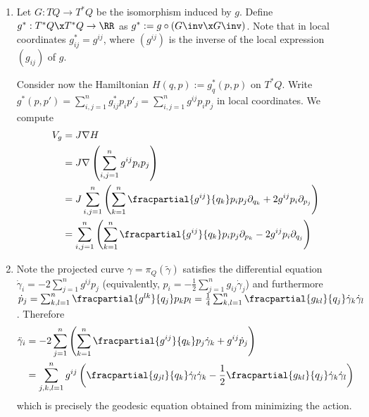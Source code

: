 
 
\begin{enumerate}
    \item Let $G:TQ\to T^*Q$ be the isomorphism induced by $g$. Define $g^*:T^*Q\x T^*Q \to \RR$  as $g^*:=g\circ (G\inv\x G\inv)$. Note that in local coordinates $g^*_{ij}=g^{ij}$, where $(g^{ij})$ is the inverse of the local expression $(g_{ij})$ of $g$.
    
    Consider now the Hamiltonian $H(q,p):=g_q^*(p,p)$ on $T^*Q$. Write $g^*(p,p')=\sum_{i,j=1}^n g^*_{ij}p_i p'_j=\sum_{i,j=1}^n g^{ij}p_i p_j$ in local coordinates. We compute
    \begin{align*}
        V_g&=J\nabla H\\
        &=J\nabla\left(\sum_{i,j=1}^n g^{ij}p_ip_j\right)\\
        &=J\sum_{i,j=1}^n\left(\sum_{k=1}^n\fracpartial{g^{ij}}{q_k} p_ip_j\partial_{q_k}+2g^{ij}p_i\partial_{p_j}\right)\\
        &=\sum_{i,j=1}^n\left(\sum_{k=1}^n\fracpartial{g^{ij}}{q_k} p_ip_j\partial_{p_k}-2g^{ij}p_i\partial_{q_j}\right)
    \end{align*}
    
    \item Note the projected curve $\gamma=\pi_Q(\tilde\gamma)$ satisfies the differential equation $\dot\gamma_i=-2\sum_{j=1}^n g^{ij}p_j$ (equivalently, $p_i=-\frac{1}{2}\sum_{j=1}^n g_{ij} \dot \gamma_j$) and furthermore $\dot p_j=\sum_{k,l=1}^n \fracpartial{g^{lk}}{q_j}p_kp_l=\frac{1}{4}\sum_{k,l=1}^n\fracpartial{g_{kl}}{q_j}\dot\gamma_k\dot\gamma_l$. Therefore
    \begin{align*}
        \ddot\gamma_i&=-2\sum_{j=1}^n \left(\sum_{k=1}^n \fracpartial{g^{ij}}{q_k}p_j\dot\gamma_k+g^{ij}\dot p_j\right)\\
        &=\sum_{j,k,l=1}^ng^{ij}\left(\fracpartial{g_{jl}}{q_k}\dot\gamma_l\dot\gamma_k-\frac{1}{2}\fracpartial{g_{kl}}{q_j}\dot\gamma_k\dot\gamma_l\right)\\
    \end{align*}
    which is precisely the geodesic equation obtained from minimizing the action.
    

\end{enumerate}
